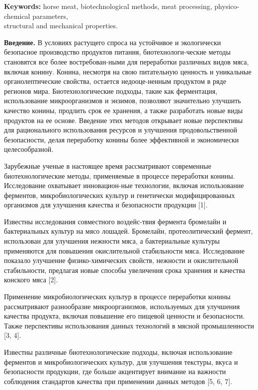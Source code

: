 {\bfseries Keywords:} horse meat, biotechnological methods, meat
processing, physico-chemical parameters,\\ structural and mechanical
properties.
\begin{multicols}{2}

{\bfseries Введение.} В условиях растущего спроса на устойчивое и
экологически безопасное производство продуктов питания,
биотехнологи-ческие методы становятся все более востребован-ными для
переработки различных видов мяса, включая конину. Конина, несмотря на
свою питательную ценность и уникальные органолептические свойства,
остается недооце-ненным продуктом в ряде регионов мира.
Биотехнологические подходы, такие как ферментация, использование
микроорганизмов и энзимов, позволяют значительно улучшить качество
конины, продлить срок ее хранения, а также разработать новые виды
продуктов на ее основе. Введение этих методов открывает новые
перспективы для рационального использования ресурсов и улучшения
продовольственной безопасности, делая переработку конины более
эффективной и экономически целесообразной.

Зарубежные ученые в настоящее время рассматривают современные
биотехнологические методы, применяемые в процессе переработки конины.
Исследование охватывает инновацион-ные технологии, включая использование
ферментов, микробиологических культур и генетически модифицированных
организмов для улучшения качества и безопасности продукции {[}1{]}.

Известны исследования совместного воздейс-твия фермента бромелайн и
бактериальных культур на мясо лошадей. Бромелайн, протеолитический
фермент, использован для улучшения нежности мяса, а бактериальные
культуры применяются для повышения окислительной стабильности мяса.
Исследование показало улучшение физико-химических свойств, нежности и
окислительной стабильности, предлагая новые способы увеличения срока
хранения и качества конского мяса {[}2{]}.

Применение микробиологических культур в процессе переработки конины
рассматривают разнообразие микроорганизмов, используемых для улучшения
качества продукта, включая повышение его пищевой ценности и
безопасности. Также перспективы использования данных технологий в мясной
промышленности {[}3, 4{]}.

Известны различные биотехнологические подходы, включая использование
ферментов и микробиологических культур, для улучшения текстуры, вкуса и
безопасности продукции, где больше акцентирует внимание на важности
соблюдения стандартов качества при применении данных методов {[}5, 6,
7{]}.


\end{multicols}
